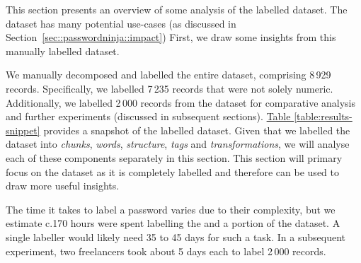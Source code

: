  This section presents an overview of some analysis of the labelled \hmail dataset. The dataset has many potential use-cases (as discussed in Section~\ref{sec::passwordninja::impact}) First, we draw some insights from this manually labelled dataset.
 
 We manually decomposed and labelled the entire \hmail dataset, comprising 8\,929 records. Specifically, we labelled 7\,235 records that were not solely numeric. Additionally, we labelled 2\,000 records from the \phpbb dataset for comparative analysis and further experiments (discussed in subsequent sections). \hyperref[table:results-snippet]{Table \ref{table:results-snippet}} provides a snapshot of the labelled dataset. Given that we labelled the dataset into \textit{chunks}, \textit{words}, \textit{structure}, \textit{tags} and \textit{transformations}, we will analyse each of these components separately in this section. This section will primary focus on the \hmail dataset as it is completely labelled and therefore can be used to draw more useful insights.

The time it takes to label a password varies due to their complexity, but we estimate c.170 hours were spent labelling the \hmail and a portion of the \phpbb dataset. A single labeller would likely need 35 to 45 days for such a task. In a subsequent experiment, two freelancers took about 5 days each to label 2\,000 records.



